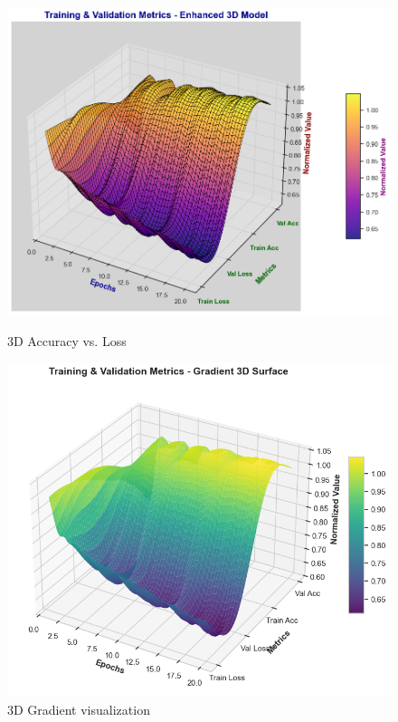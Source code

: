 \begin{figure}[htbp]
	\centering
	\begin{minipage}[b]{0.45\linewidth}
		\includegraphics[width=\linewidth]{img/paper_3/3D acc loss plot}
		\caption{3D Accuracy vs. Loss}
		\label{fig:3d-acc-loss-plot}
	\end{minipage}
	\hfill
	\begin{minipage}[b]{0.45\linewidth}
		\includegraphics[width=\linewidth]{img/paper_3/3d gradient}
		\caption{3D Gradient visualization}
		\label{fig:3d-gradient}
	\end{minipage}
\end{figure}

